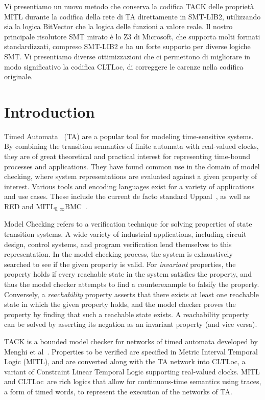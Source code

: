 \documentclass[a4paper,11pt]{report}
\theoremstyle{definition}
\newcommand{\cltloc}{CLTLoc}
\begin{document}
Vi presentiamo un nuovo metodo che conserva la codifica TACK delle proprietà
MITL durante la codifica della rete di TA direttamente in SMT-LIB2, utilizzando
sia la logica BitVector che la logica delle funzioni a valore reale. Il nostro
principale risolutore SMT mirato è lo Z3 di Microsoft, che supporta molti
formati standardizzati, compreso SMT-LIB2 e ha un forte supporto per diverse
logiche SMT\@. Vi presentiamo diverse ottimizzazioni che ci permettono di
migliorare in modo significativo la codifica CLTLoc, di correggere le
carenze nella codifica originale.

\chapter{Introduction}\label{introduction}

Timed Automata~\cite{alur94} (TA) are a popular tool for modeling time-sensitive
systems. By combining the transition semantics of finite automata with
real-valued clocks, they are of great theoretical and practical interest for
representing time-bound processes and applications. They have found common use
in the domain of model checking, where system representations are evaluated
against a given property of interest. Various tools and encoding languages exist
for a variety of applications and use cases. These include the current de facto
standard Uppaal~\cite{larsen97}, as well as RED and
$\text{MITL}_{0,\infty}$BMC~\cite{kindermann13}.

Model Checking refers to a verification technique for solving properties of
state transition systems. A wide variety of industrial applications, including
circuit design, control systems, and program verification lend themselves to
this representation. In the model checking process, the system is exhaustively
searched to see if the given property is valid. For \emph{invariant} properties,
the property holds if every reachable state in the system satisfies the
property, and thus the model checker attempts to find a counterexample to
falsify the property. Conversely, a \emph{reachability} property asserts that
there exists at least one reachable state in which the given property holds, and
the model checker proves the property by finding that such a reachable state
exists. A reachability property can be solved by asserting its negation as an
invariant property (and vice versa).


TACK is a bounded model checker for networks of timed automata developed by
Menghi et al~\cite{tack20}. Properties to be verified are specified in Metric
Interval Temporal Logic (MITL), and are converted along with the TA network into
\cltloc, a variant of Constraint Linear Temporal Logic supporting real-valued
clocks. MITL and \cltloc\ are rich logics that allow for continuous-time
semantics using traces, a form of timed words, to represent the execution of the
networks of TA.
\end{document}
